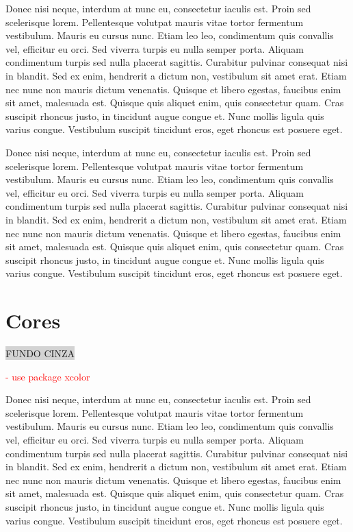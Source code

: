 \documentclass[12pt]{article}
\begin{document}
Donec nisi neque, interdum at nunc eu, consectetur iaculis est. Proin sed scelerisque lorem. Pellentesque volutpat mauris vitae tortor fermentum vestibulum. Mauris eu cursus nunc. Etiam leo leo, condimentum quis convallis vel, efficitur eu orci. Sed viverra turpis eu nulla semper porta. Aliquam condimentum turpis sed nulla placerat sagittis. Curabitur pulvinar consequat nisi in blandit. Sed ex enim, hendrerit a dictum non, vestibulum sit amet erat. Etiam nec nunc non mauris dictum venenatis. Quisque et libero egestas, faucibus enim sit amet, malesuada est. Quisque quis aliquet enim, quis consectetur quam. Cras suscipit rhoncus justo, in tincidunt augue congue et. Nunc mollis ligula quis varius congue. Vestibulum suscipit tincidunt eros, eget rhoncus est posuere eget.

Donec nisi neque, interdum at nunc eu, consectetur iaculis est. Proin sed scelerisque lorem. Pellentesque volutpat mauris vitae tortor fermentum vestibulum. Mauris eu cursus nunc. Etiam leo leo, condimentum quis convallis vel, efficitur eu orci. Sed viverra turpis eu nulla semper porta. Aliquam condimentum turpis sed nulla placerat sagittis. Curabitur pulvinar consequat nisi in blandit. Sed ex enim, hendrerit a dictum non, vestibulum sit amet erat. Etiam nec nunc non mauris dictum venenatis. Quisque et libero egestas, faucibus enim sit amet, malesuada est. Quisque quis aliquet enim, quis consectetur quam. Cras suscipit rhoncus justo, in tincidunt augue congue et. Nunc mollis ligula quis varius congue. Vestibulum suscipit tincidunt eros, eget rhoncus est posuere eget.



\section{Cores}

\pagecolor{yellow}
\colorbox{lightgray}{FUNDO CINZA}

\textcolor{red}{- use package xcolor}

Donec nisi neque, interdum at nunc eu, consectetur iaculis est. Proin sed scelerisque lorem. Pellentesque volutpat mauris vitae tortor fermentum vestibulum. Mauris eu cursus nunc. Etiam leo leo, condimentum quis convallis vel, efficitur eu orci. Sed viverra turpis eu nulla semper porta. Aliquam condimentum turpis sed nulla placerat sagittis. Curabitur pulvinar consequat nisi in blandit. Sed ex enim, hendrerit a dictum non, vestibulum sit amet erat. Etiam nec nunc non mauris dictum venenatis. Quisque et libero egestas, faucibus enim sit amet, malesuada est. Quisque quis aliquet enim, quis consectetur quam. Cras suscipit rhoncus justo, in tincidunt augue congue et. Nunc mollis ligula quis varius congue. Vestibulum suscipit tincidunt eros, eget rhoncus est posuere eget.
\end{document}
